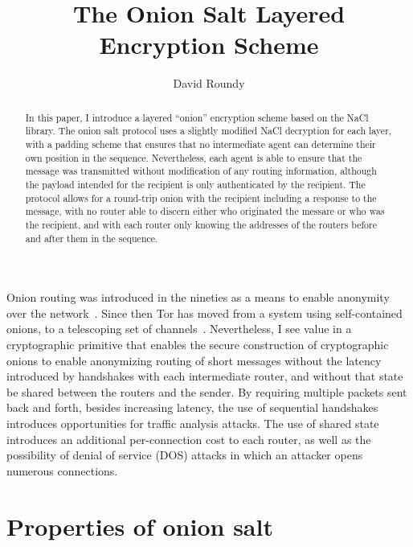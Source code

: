 \documentclass[letterpaper,twocolumn,amsmath,amssymb,pre,aps,10pt]{revtex4-1}
\begin{document}
\title{The Onion Salt Layered Encryption Scheme}
\author{David Roundy}

\begin{abstract}
  In this paper, I introduce a layered ``onion'' encryption scheme
  based on the NaCl library.  The onion salt protocol uses a slightly
  modified NaCl decryption for each layer, with a padding scheme that
  ensures that no intermediate agent can determine their own position
  in the sequence.  Nevertheless, each agent is able to ensure that
  the message was transmitted without modification of any routing
  information, although the payload intended for the recipient is only
  authenticated by the recipient.  The protocol allows for a
  round-trip onion with the recipient including a response to the
  message, with no router able to discern either who originated the
  messare or who was the recipient, and with each router only knowing
  the addresses of the routers before and after them in the sequence.
\end{abstract}

\maketitle

Onion routing was introduced in the nineties as a means to enable
anonymity over the network~\cite{reed1998onionrouting}.  Since then
Tor has moved from a system using self-contained onions, to a
telescoping set of channels~\cite{dingledine2004tor}.  Nevertheless, I
see value in a cryptographic primitive that enables the secure
construction of cryptographic onions to enable anonymizing routing of
short messages without the latency introduced by handshakes with each
intermediate router, and without that state be shared between the
routers and the sender.  By requiring multiple packets sent back and
forth, besides increasing latency, the use of sequential handshakes
introduces opportunities for traffic analysis attacks.  The use of
shared state introduces an additional per-connection cost to each
router, as well as the possibility of denial of service (DOS) attacks
in which an attacker opens numerous connections.

\newcommand\Nrouter{\ensuremath{N_{\text{router}}}}

\section{Properties of onion salt}
\end{document}
